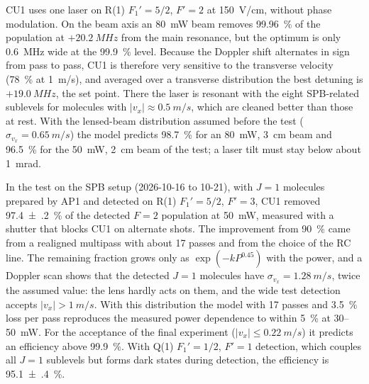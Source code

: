 \documentclass[11pt,a4paper,oneside]{report}
\begin{document}
CU1 uses one laser on R(1) $F_1'=5/2$, $F'=2$ at \SI{150}{V/cm}, without phase modulation. On
the beam axis an \SI{80}{mW} beam removes \SI{99.96}{\percent} of the population at
$+\SI{20.2}{MHz}$ from the main resonance, but the optimum is only \SI{0.6}{MHz} wide at the
\SI{99.9}{\percent} level. Because the Doppler shift alternates in sign from pass to pass, CU1 is
therefore very sensitive to the transverse velocity (\SI{78}{\percent} at \SI{1}{m/s}), and
averaged over a transverse distribution the best detuning is $+\SI{19.0}{MHz}$, the set point.
There the laser is resonant with the eight SPB-related sublevels for molecules with
$|v_x|\approx\SI{0.5}{m/s}$, which are cleaned better than those at rest. With the lensed-beam
distribution assumed before the test ($\sigma_{v_x}=\SI{0.65}{m/s}$) the model predicts
\SI{98.7}{\percent} for an \SI{80}{mW}, \SI{3}{cm} beam and \SI{96.5}{\percent} for the
\SI{50}{mW}, \SI{2}{cm} beam of the test; a laser tilt must stay below about \SI{1}{mrad}.

In the test on the SPB setup (2026-10-16 to 10-21), with $J=1$ molecules prepared by AP1 and
detected on R(1) $F_1'=5/2$, $F'=3$, CU1 removed \SI{97.4(2)}{\percent} of the detected $F=2$
population at \SI{50}{mW}, measured with a shutter that blocks CU1 on alternate shots. The
improvement from \SI{90}{\percent} came from a realigned multipass with about 17 passes and from
the choice of the RC line. The remaining fraction grows only as $\exp(-kP^{0.45})$ with the power,
and a Doppler scan shows that the detected $J=1$ molecules have $\sigma_{v_x}=\SI{1.28}{m/s}$, twice
the assumed value: the lens hardly acts on them, and the wide test detection accepts
$|v_x|>\SI{1}{m/s}$. With this distribution the model with 17 passes and \SI{3.5}{\percent} loss per
pass reproduces the measured power dependence to within \SI{5}{\percent} at 30--\SI{50}{mW}. For the
acceptance of the final experiment ($|v_x|\leq\SI{0.22}{m/s}$) it predicts an efficiency above
\SI{99.9}{\percent}. With Q(1) $F_1'=1/2$, $F'=1$ detection, which couples all $J=1$ sublevels but
forms dark states during detection, the efficiency is \SI{95.1(4)}{\percent}.
\end{document}
